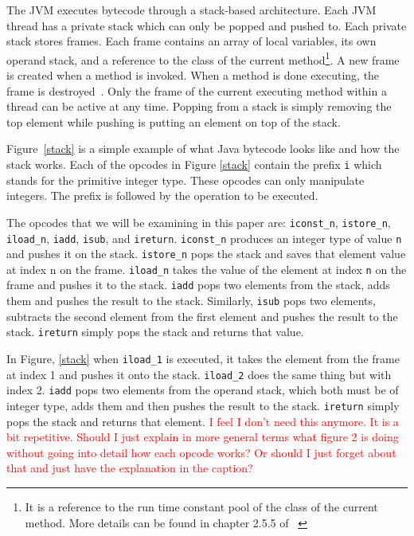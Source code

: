\documentclass{sig-alternate}
\newcommand{\mycomment}[1]{\textcolor{red}{#1}}
\begin{document}
The JVM executes bytecode through a stack-based architecture. Each JVM thread has a private stack which can only be popped and pushed to. Each private stack stores frames. Each frame contains an array of local variables, its own operand stack, and a reference to the class of the current method\footnote{It is a reference to the run time constant pool of the class of the current method. More details can be found in chapter 2.5.5 of ~\cite{JVMspec:2013}}. A new frame is created when a method is invoked. When a method is done executing, the frame is destroyed~\cite{Oracle:2013}. Only the frame of the current executing method within a thread can be active at any time. Popping from a stack is simply removing the top element while pushing is putting an element on top of the stack.

Figure~\ref{stack} is a simple example of what Java bytecode looks like and how the stack works. Each of the opcodes in Figure \ref{stack} contain the prefix \texttt{i} which stands for the primitive integer type. These opcodes can only manipulate integers. The prefix is followed by the operation to be executed.\par 

The opcodes that we will be examining in this paper are: \texttt{iconst\_n}, \texttt{istore\_n}, \texttt{iload\_n}, \texttt{iadd}, \texttt{isub}, and \texttt{ireturn}. \texttt{iconst\_n} produces an integer type of value \texttt{n} and pushes it on the stack. \texttt{istore\_n} pops the stack and saves that element value at index n on the frame. \texttt{iload\_n} takes the value of the element at index \texttt{n} on the frame and pushes it to the stack. \texttt{iadd} pops two elements from the stack, adds them and pushes the result to the stack. Similarly, \texttt{isub} pops two elements, subtracts the second element from the first element and pushes the result to the stack. \texttt{ireturn} simply pops the stack and returns that value.

In Figure, \ref{stack} when \texttt{iload\_1} is executed, it takes the element from the frame at index 1 and pushes it onto the stack. \texttt{iload\_2} does the same thing but with index 2. \texttt{iadd} pops two elements from the operand stack, which both must be of integer type, adds them and then pushes the result to the stack. \texttt{ireturn} simply pops the stack and returns that element. \mycomment{I feel I don't need this anymore. It is a bit repetitive. Should I just explain in more general terms what figure 2 is doing without going into detail how each opcode works? Or should I just forget about that and just have the explanation in the caption?}
\end{document}
